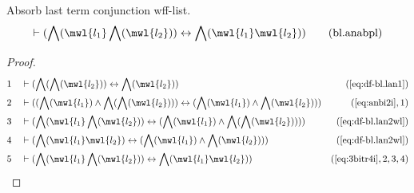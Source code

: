 \begin{lemma} {Absorb last term conjunction wff-list.}
\begin{align}
\vdash ( \bigwedge( \mwl{l_1} \bigwedge( \mwl{l_2} ) ) \leftrightarrow
    \bigwedge( \mwl{l_1} \mwl{l_2} ) )\label{eq:bl.anabpl}\tag{bl.anabpl}
\end{align}
\end{lemma}


\begin{proof}
\begin{align}
  1 &&  & \vdash ( \bigwedge( \bigwedge( \mwl{l_2} ) ) \leftrightarrow
     \bigwedge( \mwl{l_2} )
     )&(\mbox{\ref{eq:df-bl.lan1}})\notag
  \\ 2 &&  & \vdash ( ( \bigwedge( \mwl{l_1} ) \wedge \bigwedge( \bigwedge(
     \mwl{l_2} ) ) ) \leftrightarrow ( \bigwedge(
     \mwl{l_1} ) \wedge \bigwedge( \mwl{l_2} ) )
     )&(\mbox{\ref{eq:anbi2i}},1)\notag
  \\ 3 &&  & \vdash ( \bigwedge( \mwl{l_1} \bigwedge( \mwl{l_2} ) )
     \leftrightarrow ( \bigwedge( \mwl{l_1} ) \wedge
     \bigwedge( \bigwedge( \mwl{l_2} ) ) )
     )&(\mbox{\ref{eq:df-bl.lan2wl}})\notag
  \\ 4 &&  & \vdash ( \bigwedge( \mwl{l_1} \mwl{l_2} ) \leftrightarrow (
     \bigwedge( \mwl{l_1} ) \wedge \bigwedge( \mwl{l_2} )
     ) )&(\mbox{\ref{eq:df-bl.lan2wl}})\notag
  \\ 5 &&  & \vdash ( \bigwedge( \mwl{l_1} \bigwedge( \mwl{l_2} ) )
     \leftrightarrow \bigwedge( \mwl{l_1} \mwl{l_2} )
     )&(\mbox{\ref{eq:3bitr4i}},2,3,4)\notag
\end{align}
\end{proof}

